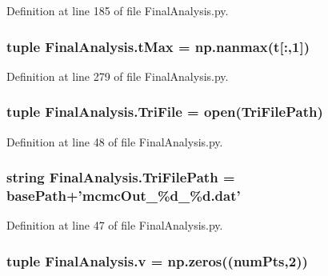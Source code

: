 Definition at line 185 of file Final\-Analysis.\-py.

\hypertarget{namespace_final_analysis_a3e720a14f79520011003b9f32ec0e4b2}{
\subsubsection[{t\-Max}]{\setlength{\rightskip}{0pt plus 5cm}tuple Final\-Analysis.\-t\-Max = np.\-nanmax({\bf t}\mbox{[}\-:,1\mbox{]})}}\label{namespace_final_analysis_a3e720a14f79520011003b9f32ec0e4b2}


Definition at line 279 of file Final\-Analysis.\-py.

\hypertarget{namespace_final_analysis_a05fafd47a96b32e6c3dc6e30dac35672}{
\subsubsection[{Tri\-File}]{\setlength{\rightskip}{0pt plus 5cm}tuple Final\-Analysis.\-Tri\-File = open({\bf Tri\-File\-Path})}}\label{namespace_final_analysis_a05fafd47a96b32e6c3dc6e30dac35672}


Definition at line 48 of file Final\-Analysis.\-py.

\hypertarget{namespace_final_analysis_abf963966146e1751a9c7aeb6a4df238a}{
\subsubsection[{Tri\-File\-Path}]{\setlength{\rightskip}{0pt plus 5cm}string Final\-Analysis.\-Tri\-File\-Path = base\-Path+'mcmc\-Out\-\_\-\%d\-\_\-\%d.\-dat'}}\label{namespace_final_analysis_abf963966146e1751a9c7aeb6a4df238a}


Definition at line 47 of file Final\-Analysis.\-py.

\hypertarget{namespace_final_analysis_a8fb9ac591a57f2affeeb677906de4d5f}{
\subsubsection[{v}]{\setlength{\rightskip}{0pt plus 5cm}tuple Final\-Analysis.\-v = np.\-zeros(({\bf num\-Pts},2))}}\label{namespace_final_analysis_a8fb9ac591a57f2affeeb677906de4d5f}


